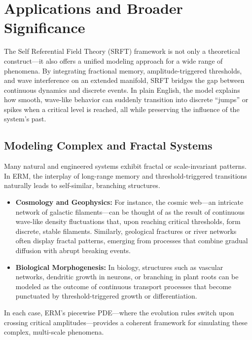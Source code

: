 \documentclass[12pt]{article}
\begin{document}
\section{Applications and Broader Significance}
\label{sec:applications_significance}

The Self Referential Field Theory (SRFT) framework is not only a theoretical construct—it also offers a unified modeling approach for a wide range of phenomena. By integrating fractional memory, amplitude-triggered thresholds, and wave interference on an extended manifold, SRFT bridges the gap between continuous dynamics and discrete events. In plain English, the model explains how smooth, wave-like behavior can suddenly transition into discrete “jumps” or spikes when a critical level is reached, all while preserving the influence of the system’s past.

\medskip

\subsection{Modeling Complex and Fractal Systems}
Many natural and engineered systems exhibit fractal or scale-invariant patterns. In ERM, the interplay of long-range memory and threshold-triggered transitions naturally leads to self-similar, branching structures.

\begin{itemize}
    \item \textbf{Cosmology and Geophysics:}  
          For instance, the cosmic web—an intricate network of galactic filaments—can be thought of as the result of continuous wave-like density fluctuations that, upon reaching critical thresholds, form discrete, stable filaments. Similarly, geological fractures or river networks often display fractal patterns, emerging from processes that combine gradual diffusion with abrupt breaking events.
    \item \textbf{Biological Morphogenesis:}  
          In biology, structures such as vascular networks, dendritic growth in neurons, or branching in plant roots can be modeled as the outcome of continuous transport processes that become punctuated by threshold-triggered growth or differentiation.
\end{itemize}

\noindent
In each case, ERM’s piecewise PDE—where the evolution rules switch upon crossing critical amplitudes—provides a coherent framework for simulating these complex, multi-scale phenomena.
\end{document}
